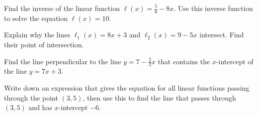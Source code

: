 \documentclass[11pt,letterpaper]{article}
\begin{document}

 Find the inverse of the linear function $\ell(x)= \frac{5}{6} - 8x$. Use this inverse function to solve the equation $\ell(x)= 10$. 



\newpage



 Explain why the lines $\ell_1(x)= 8x + 3$ and $\ell_2(x)= 9 - 5x$ intersect. Find their point of intersection. 



\newpage

 

 Find the line perpendicular to the line $y= 7 - \frac{2}{3}x$ that contains the $x$-intercept of the line $y= 7x + 3$. 



\newpage



 Write down an expression that gives the equation for all linear functions passing through the point $(3, 5)$, then use this to find the line that passes through $(3, 5)$ and has $x$-intercept $-6$. 
\end{document}

